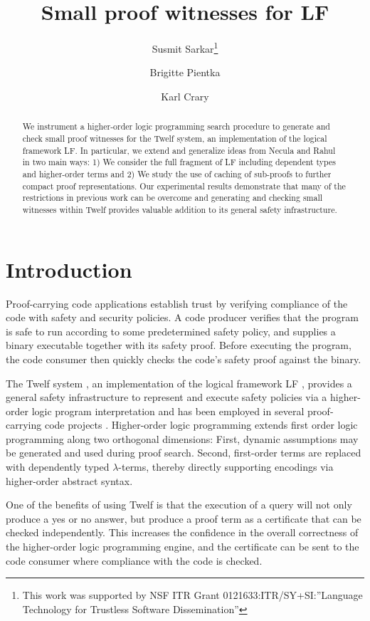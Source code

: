 \documentclass{llncs}
\title{Small proof witnesses for LF}
\author{
Susmit Sarkar\inst{1}\thanks{This work was supported by NSF ITR Grant 0121633:ITR/SY+SI:''Language Technology for Trustless Software Dissemination''}
\and Brigitte Pientka\inst{2}
\and Karl Crary\inst{1}}%
\institute{%
Carnegie Mellon University, Pittsburgh, USA
\and McGill University, Montr\'eal, Canada
}
\date{}
\begin{document}
\maketitle 
\begin{abstract}
We instrument a higher-order logic programming search procedure to
generate and check small proof witnesses for the Twelf system, an
implementation of the logical framework LF. In particular, we extend
and generalize ideas from Necula and Rahul~\cite{Necula+01:oracle} in
two main ways: 1) We consider the full fragment of LF including
dependent types and higher-order terms and 2) We study the use of
caching of sub-proofs to further compact proof representations. Our
experimental results demonstrate that many of the restrictions in
previous work can be overcome and generating and checking small
witnesses within Twelf provides valuable addition to its general
safety infrastructure.
\end{abstract}

\section{Introduction}
Proof-carrying code applications establish trust by verifying
compliance of the code with safety and security policies.
A code producer verifies that the program is safe to
run according to some predetermined safety policy, and supplies a
binary executable together with its safety proof. Before
executing the program, the code consumer then quickly checks the code's
safety proof against the binary. 

The Twelf system \cite{Pfenning99cade}, an implementation of the
logical framework LF \cite{Harper93jacm}, provides a general safety
infrastructure to represent and execute safety policies via a
higher-order logic program interpretation and has been employed in
several proof-carrying code projects
\cite{AppelFelty00,Crary:POPL03,AppelFelten99,Crary:CADE03}.
Higher-order logic programming extends first order logic programming
along two orthogonal dimensions: First, dynamic assumptions may be
generated and used during proof search. Second, first-order terms are
replaced with dependently typed $\lambda$-terms, thereby directly
supporting encodings via higher-order abstract syntax.

One of the benefits of using Twelf is that the execution of a query
will not only produce a yes or no answer, but produce a proof term as
a certificate that can be checked independently.  This increases the
confidence in the overall correctness of the higher-order logic
programming engine, and the certificate can be sent to the code
consumer where compliance with the code is checked.
\end{document}
